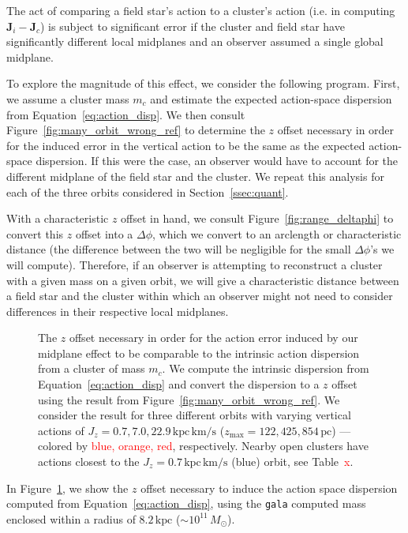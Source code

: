 \documentclass[twocolumn]{aastex62}
\newcommand{\Gus}[1]{\textcolor{red}{#1}}
\newcommand{\pc}{\text{pc}}
\newcommand{\kpc}{\text{kpc}}
\newcommand{\kms}{\text{km}/\text{s}}
\newcommand{\actunit}{\text{kpc}\,\kms}
\begin{document}
The act of comparing a field star's action to a cluster's action (i.e. in
computing $\bm{J}_i - \bm{J}_c$) is subject to significant error if the
cluster and field star have significantly different local midplanes and an
observer assumed a single global midplane.

To explore the magnitude of this effect, we consider the following program.
First, we assume a cluster mass $m_c$ and estimate the expected action-space
dispersion from Equation~\ref{eq:action_disp}. We then consult
Figure~\ref{fig:many_orbit_wrong_ref} to determine the $z$ offset necessary in
order for the induced error in the vertical action to be the same as the
expected action-space dispersion. If this were the case, an observer would
have to account for the different midplane of the field star and the cluster.
We repeat this analysis for each of the three orbits considered in
Section~\ref{ssec:quant}.

With a characteristic $z$ offset in hand, we consult
Figure~\ref{fig:range_deltaphi} to convert this $z$ offset into a $\Delta
\phi$, which we convert to an arclength or characteristic distance (the
difference between the two will be negligible for the small $\Delta \phi$'s we
will compute). Therefore, if an observer is attempting to reconstruct a
cluster with a given mass on a given orbit, we will give a characteristic
distance between a field star and the cluster within which an observer might
not need to consider differences in their respective local midplanes.

\begin{figure}
\caption{The $z$ offset necessary in order for the action error induced by our
midplane effect to be comparable to the intrinsic action dispersion from a
cluster of mass $m_c$. We compute the intrinsic dispersion from
Equation~\ref{eq:action_disp} and convert the dispersion to a $z$ offset using
the result from Figure~\ref{fig:many_orbit_wrong_ref}. We consider the result
for three different orbits with varying vertical actions of $J_z = 0.7, 7.0,
22.9\,\actunit$ ($z_{\text{max}} = 122,425,854\,\pc$) --- colored by
\Gus{blue, orange, red}, respectively. Nearby open clusters have actions
closest to the $J_z=0.7\,\actunit$ (blue) orbit, see Table~\Gus{x}.}
\label{fig:cluster_offset}
\end{figure}

In Figure~\ref{fig:cluster_offset}, we show the $z$ offset necessary to induce
the action space dispersion computed from Equation~\ref{eq:action_disp}, using
the \texttt{gala} computed mass enclosed within a radius of $8.2\,\kpc$ ($\sim
10^{11}\,M_{\odot}$).
\end{document}
